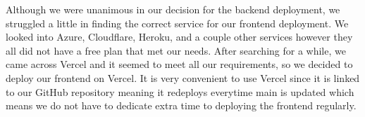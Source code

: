 Although we were unanimous in our decision for the backend deployment, we struggled a little in finding the correct service for our frontend deployment. We looked into Azure, Cloudflare, Heroku, and a couple other services however they all did not have a free plan that met our needs. After searching for a while, we came across Vercel and it seemed to meet all our requirements, so we decided to deploy our frontend on Vercel. It is very convenient to use Vercel since it is linked to our GitHub repository meaning it redeploys everytime main is updated which means we do not have to dedicate extra time to deploying the frontend regularly.
